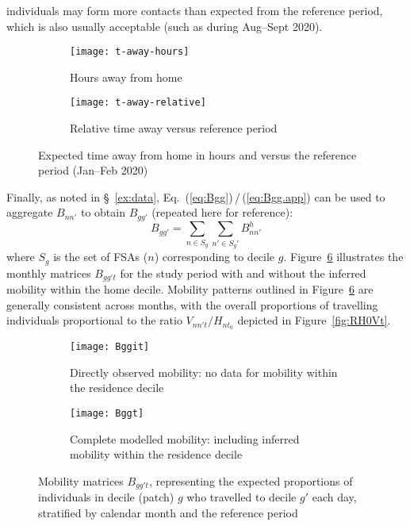 individuals may form more contacts than expected from the reference period,
which is also usually acceptable (such as during Aug--Sept 2020).
\begin{figure}
  \centering
  \begin{subfigure}{0.4\linewidth}
    \texttt{[image: t-away-hours]}
    \caption{Hours away from home}
    \label{fig:W-hours}
  \end{subfigure}
  \begin{subfigure}{0.4\linewidth}
    \texttt{[image: t-away-relative]}
    \caption{Relative time away versus reference period}
    \label{fig:W-relative}
  \end{subfigure}
  \caption{Expected time away from home in hours and versus the reference period (Jan--Feb 2020)}
  \label{fig:W}
\end{figure}
\par
Finally, as noted in \S~\ref{ex:data}, Eq.~(\ref{eq:Bgg})\,/\,(\ref{eq:Bgg.app})
can be used to aggregate $B_{nn'}$ to obtain $B_{gg'}$ (repeated here for reference):
\begin{equation}\label{eq:Bgg.app}
  B_{gg'} = \sum_{n \in S_g}\sum_{n' \in S_g'} B^h_{nn'}
\end{equation}
where $S_g$ is the set of FSAs ($n$) corresponding to decile $g$.
Figure~\ref{fig:Bggt} illustrates the monthly matrices $B_{gg't}$ for the study period
with and without the inferred mobility within the home decile.
Mobility patterns outlined in Figure~\ref{fig:Bggt} are generally consistent across months,
with the overall proportions of travelling individuals
proportional to the ratio $V_{nn't} / H_{nt_0}$ depicted in Figure~\ref{fig:RH0Vt}.
\begin{figure}[ht]
  \centering
  \begin{subfigure}{\linewidth}
    \texttt{[image: Bggit]}
    \caption{Directly observed mobility: no data for mobility within the residence decile}
    \label{fig:Bggot}
  \end{subfigure}
  \begin{subfigure}{\linewidth}
    \texttt{[image: Bggt]}
    \caption{Complete modelled mobility: including inferred mobility within the residence decile}
    \label{fig:Bggdt}
  \end{subfigure}
  \caption{Mobility matrices $B_{gg't}$, representing the expected proportions of individuals
    in decile (patch) $g$ who travelled to decile $g'$ each day,
    stratified by calendar month and the reference period}
  \label{fig:Bggt}
\end{figure}
\clearpage
